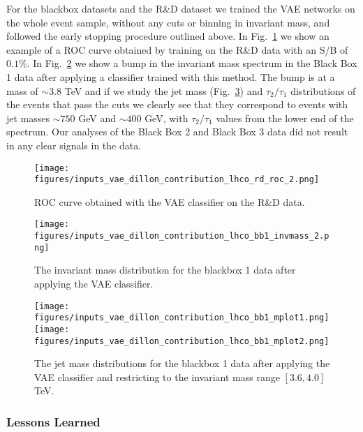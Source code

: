 \documentclass[a4paper,11pt]{article}
\begin{document}
\noindent For the blackbox datasets and the R\&D dataset we trained the VAE networks on the whole event sample, without any cuts or binning in invariant mass, and followed the early stopping procedure outlined above.
In Fig.~\ref{fig:fig1} we show an example of a ROC curve obtained by training on the R\&D data with an S/B of $0.1\%$.
In Fig.~\ref{fig:fig2} we show a bump in the invariant mass spectrum in the Black Box 1 data after applying a classifier trained with this method.
The bump is at a mass of $\sim 3.8$ TeV and if we study the jet mass (Fig.~\ref{fig:fig3}) and $\tau_2/\tau_1$ distributions of the events that pass the cuts we clearly see that they correspond to events with jet masses $\sim 750$ GeV and $\sim400$ GeV, with $\tau_2/\tau_1$ values from the lower end of the spectrum.
Our analyses of the Black Box 2 and Black Box 3 data did not result in any clear signals in the data.

\begin{figure}[h!]
\centering
\texttt{[image: figures/inputs\_vae\_dillon\_contribution\_lhco\_rd\_roc\_2.png]}
    \caption{ROC curve obtained with the VAE classifier on the R\&D data.\label{fig:fig1}}
\label{fig:fig1}
\end{figure}

\begin{figure}[h!]
\centering
\texttt{[image: figures/inputs\_vae\_dillon\_contribution\_lhco\_bb1\_invmass\_2.png]}
    \caption{The invariant mass distribution for the blackbox 1 data after applying the VAE classifier.\label{fig:fig2}}
\label{fig:fig2}
\end{figure}

\begin{figure}[h!]
\centering
\texttt{[image: figures/inputs\_vae\_dillon\_contribution\_lhco\_bb1\_mplot1.png]}
\texttt{[image: figures/inputs\_vae\_dillon\_contribution\_lhco\_bb1\_mplot2.png]}
    \caption{The jet mass distributions for the blackbox 1 data after applying the VAE classifier and restricting to the invariant mass range $[3.6,4.0]$ TeV.\label{fig:fig3}}
\end{figure}


\subsubsection{Lessons Learned}
\label{sec:lessons}
\end{document}
